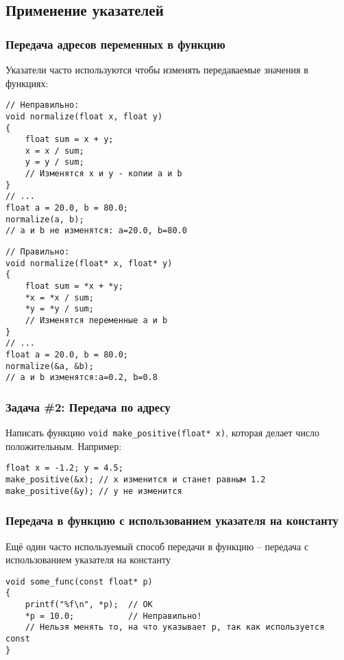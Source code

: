 \documentclass{article}
\begin{document}
\subsection*{Применение указателей}
\subsubsection*{Передача адресов переменных в функцию}
Указатели часто используются чтобы изменять передаваемые значения в функциях:
\begin{multicols}{2}
\begin{lstlisting}
// Неправильно:
void normalize(float x, float y)
{
    float sum = x + y;
    x = x / sum;
    y = y / sum; 
    // Изменятся x и y - копии a и b
}
// ...
float a = 20.0, b = 80.0;
normalize(a, b);
// a и b не изменятся: a=20.0, b=80.0
\end{lstlisting}
\begin{lstlisting}
// Правильно:
void normalize(float* x, float* y)
{
    float sum = *x + *y;
    *x = *x / sum;
    *y = *y / sum; 
    // Изменятся переменные a и b
}
// ...
float a = 20.0, b = 80.0;
normalize(&a, &b);
// a и b изменятся:a=0.2, b=0.8
\end{lstlisting}
\end{multicols}

\subsubsection*{\Squarepipe \quad Задача \#2: Передача по адресу}
Написать функцию \texttt{void make\_positive(float* x)}, которая делает число положительным. Например:
\begin{lstlisting}
float x = -1.2; y = 4.5;
make_positive(&x); // x изменится и станет равным 1.2
make_positive(&y); // y не изменится
\end{lstlisting}

\subsubsection*{Передача в функцию с использованием указателя на константу}
Ещё один часто используемый способ передачи в функцию -- передача с использованием указателя на константу
\begin{lstlisting}
void some_func(const float* p)
{
	printf("%f\n", *p);  // ОК
	*p = 10.0;           // Неправильно! 
	// Нельзя менять то, на что указывает p, так как используется const
}
\end{lstlisting}
\end{document}
